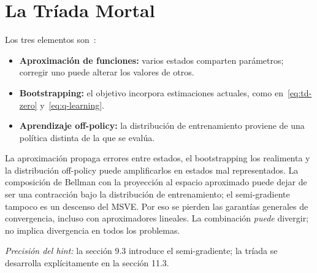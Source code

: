 \section{La Tríada Mortal}
Los tres elementos son~\cite[secc.~11.3]{sutton}:
\begin{itemize}
    \item \textbf{Aproximación de funciones:} varios estados comparten parámetros; corregir uno puede alterar los valores de otros.
    \item \textbf{Bootstrapping:} el objetivo incorpora estimaciones actuales, como en~\eqref{eq:td-zero} y~\eqref{eq:q-learning}.
    \item \textbf{Aprendizaje off-policy:} la distribución de entrenamiento proviene de una política distinta de la que se evalúa.
\end{itemize}
La aproximación propaga errores entre estados, el bootstrapping los realimenta y la distribución off-policy puede amplificarlos en estados mal representados. La composición de Bellman con la proyección al espacio aproximado puede dejar de ser una contracción bajo la distribución de entrenamiento; el semi-gradiente tampoco es un descenso del MSVE. Por eso se pierden las garantías generales de convergencia, incluso con aproximadores lineales. La combinación \emph{puede} divergir; no implica divergencia en todos los problemas.

\textit{Precisión del hint:} la sección 9.3 introduce el semi-gradiente; la tríada se desarrolla explícitamente en la sección 11.3.
